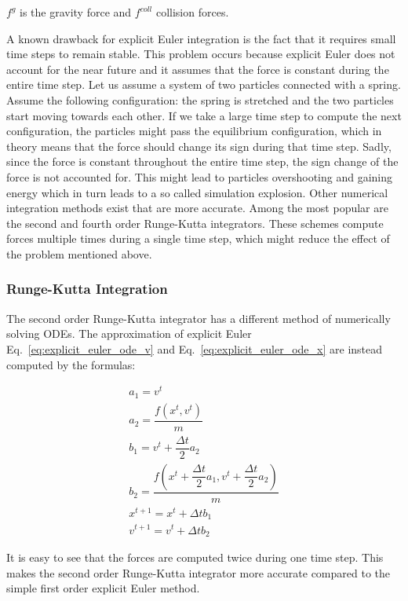 \documentclass[en]{minipw} %
\begin{document}
$f^{g}$ is the gravity force and $f^{coll}$ collision forces.

A known drawback for explicit Euler integration is the fact that it requires small time steps to remain stable. This problem occurs because explicit Euler does not account for the near future and it assumes that the force is constant during the entire time step. Let us assume a system of two particles connected with a spring. Assume the following configuration: the spring is stretched and the two particles start moving towards each other. If we take a large time step to compute the next configuration, the particles might pass the equilibrium configuration, which in theory means that the force should change its sign during that time step. Sadly, since the force is constant throughout the entire time step, the sign change of the force is not accounted for. This might lead to particles overshooting and gaining energy which in turn leads to a so called simulation explosion.
Other numerical integration methods exist that are more accurate. Among the most popular are the second and fourth order Runge-Kutta integrators. These schemes compute forces multiple times during a single time step, which might reduce the effect of the problem mentioned above.

\subsubsection{Runge-Kutta Integration}
The second order Runge-Kutta integrator has a different method of numerically solving ODEs. The approximation of explicit Euler Eq.~\ref{eq:explicit_euler_ode_v} and Eq.~\ref{eq:explicit_euler_ode_x} are instead computed by the formulas:


\begin{equation}
\begin{aligned}
a_1 = v^t
\\
a_2 = \dfrac{f(x^t, v^t)}{m}
\\
b_1 = v^t + \dfrac{\Delta t}{2} a_2
\\
b_2 = \dfrac{f(x^t + \dfrac{\Delta t}{2} a_1, v^t + \dfrac{\Delta t}{2} a_2)}{m}
\\
x^{t+1} = x^{t} + \Delta t b_1
\\
v^{t+1} = v^{t} + \Delta t b_2
\end{aligned}
\end{equation}

It is easy to see that the forces are computed twice during one time step. This makes the second order Runge-Kutta integrator more accurate compared to the simple first order explicit Euler method.
\end{document}
